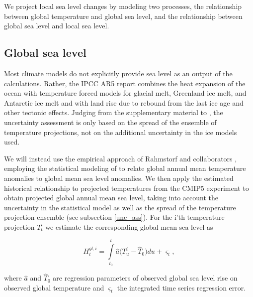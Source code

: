 \documentclass[draft,linenumbers]{agujournal}
\begin{document}
We project local sea level changes by modeling two processes, the relationship between global temperature and global sea level, and the relationship between global sea level and local sea level.

\subsection{Global sea level}
Most climate models do not explicitly provide sea level as an output of the calculations. Rather, the IPCC AR5 report \citep[ch.~13]{ipcc} combines the heat expansion of the ocean with temperature forced models for glacial melt, Greenland ice melt, and Antarctic ice melt and with land rise due to rebound from the last ice age and other tectonic effects. Judging from the supplementary material to \citet[ch.~13]{ipcc}, the uncertainty assessment is only based on the spread of the ensemble of temperature projections, not on the additional uncertainty in the ice models used.

We will instead use the empirical approach of Rahmstorf and collaborators \citep{Rahmstorf07,Rahmstorf11}, employing the statistical modeling of \citet{Bolin2014a} to relate global annual mean temperature anomalies to global mean sea level anomalies. 
We then apply the estimated historical relationship to projected temperatures from the CMIP5 experiment \citep{cmip5} to obtain projected global annual mean sea level, taking into account the uncertainty in the statistical model as well as the spread of the temperature projection ensemble (see subsection \ref{unc_ass}). 
For the i'th temperature projection $T_t^i$ we estimate the corresponding global mean sea level as
\begin{linenomath*}
\[H_t^{gl,i} = \int\limits_{{t_0}}^t {{\hat a} (T_u^i - {{\hat T}_0}} )du + {\varsigma _t},\]
\end{linenomath*}
where ${\hat a}$ and ${\hat T}_0$ are regression parameters of observed global sea level  rise on observed global temperature and $\varsigma_t$ the integrated time series regression error.
\end{document}
